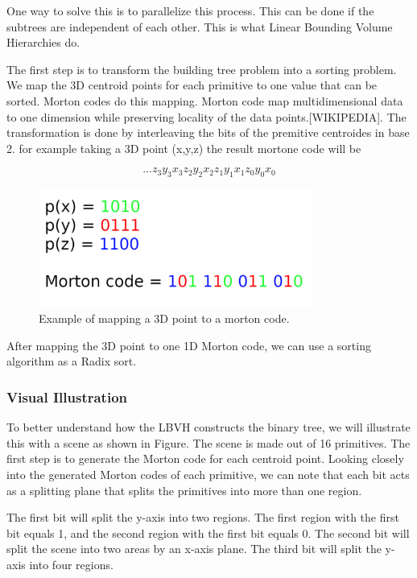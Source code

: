 \documentclass[11pt,a4paper]{article}
\begin{document}
One way to solve this is to parallelize this process. This can be done if the subtrees are independent of each other. This is what Linear Bounding Volume Hierarchies do.

The first step is to transform the building tree problem into a sorting problem. We map the 3D centroid points for each primitive to one value that can be sorted. Morton codes do this mapping. Morton code map multidimensional data to one dimension while preserving locality of the data points.[WIKIPEDIA]. The transformation is done by interleaving the bits of the premitive centroides in base 2. for example taking a 3D point (x,y,z) the result mortone code will be 

\[ ...z_3y_3x_3z_2y_2x_2z_1y_1x_1z_0y_0x_0 \]


\begin{figure}[h]	
     \centering
         \includegraphics[width=9cm]{images/z_curve.png}
        \caption{Example of mapping a 3D point to a morton code.}
        \label{fig:dice}
\end{figure}


After mapping the 3D point to one 1D Morton code, we can use a sorting algorithm as a Radix sort.

\subsubsection{Visual Illustration}
To better understand how the LBVH constructs the binary tree, we will illustrate this with a scene as shown in Figure. The scene is made out of 16 primitives. The first step is to generate the Morton code for each centroid point. Looking closely into the generated Morton codes of each primitive, we can note that each bit acts as a splitting plane that splits the primitives into more than one region. 

The first bit will split the y-axis into two regions. The first region with the first bit equals 1, and the second region with the first bit equals 0. The second bit will split the scene into two areas by an x-axis plane. The third bit will split the y-axis into four regions.
\end{document}
